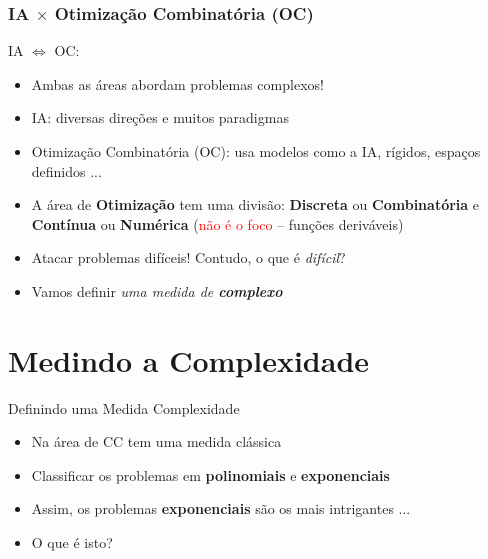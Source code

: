 \documentclass{beamer}
\begin{document}
\begin{frame}[fragile]
\frametitle{IA $\times $ Otimização Combinatória (OC)}

\begin{block}{IA $\Leftrightarrow $ OC:}
  \begin{itemize}
   \item  Ambas as áreas abordam problemas complexos!

    \item IA: diversas direções e muitos paradigmas

    \item Otimização Combinatória (OC): usa modelos como a IA, rígidos, espaços definidos ...
    
        \item A área de \textbf{Otimização} tem uma divisão: \textbf{Discreta} ou \textbf{Combinatória} e 
        \textbf{Contínua} ou \textbf{Numérica} (\textcolor{red}{não é o foco} -- funções deriváveis)
        
        \item  Atacar problemas difíceis! Contudo, o que é \textit{difícil}?
        
                
       \item   Vamos definir \textit{uma medida de \textbf{complexo}}
    \end{itemize}
  
  \end{block}

\end{frame}



\section{Medindo a Complexidade}

\begin{frame}
\begin{block}{Definindo uma Medida Complexidade}
  \begin{itemize}
 
  \item Na área de CC tem uma medida clássica
  \item Classificar os problemas em \textbf{polinomiais} e \textbf{exponenciais}
     
     \item Assim, os problemas  \textbf{exponenciais} são os mais intrigantes ...
     \item O que é isto?
  \end{itemize}
\end{block}
\end{frame}
\end{document}
